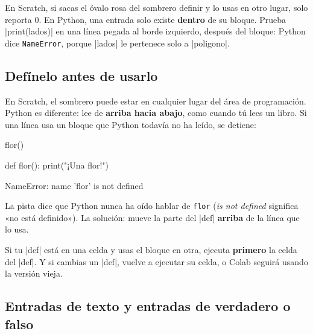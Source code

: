 \begin{think}
En Scratch, si sacas el óvalo rosa  del sombrero definir y lo usas en otro lugar, solo reporta 0. En Python, una entrada solo existe \textbf{dentro} de su bloque. Prueba \py|print(lados)| en una línea pegada al borde izquierdo, después del bloque: Python dice \texttt{NameError}, porque \py|lados| le pertenece solo a \py|poligono|.
\end{think}

\subsection*{Defínelo antes de usarlo}

En Scratch, el sombrero  puede estar en cualquier lugar del área de programación. Python es diferente: lee de \textbf{arriba hacia abajo}, como cuando tú lees un libro. Si una línea usa un bloque que Python todavía no ha leído, se detiene:

\begin{code}
flor()

def flor():
    print("¡Una flor!")
\end{code}
\begin{errorbox}
NameError: name 'flor' is not defined
\end{errorbox}

La pista dice que Python nunca ha oído hablar de \texttt{flor} (\textit{is not defined} significa «no está definido»). La solución: mueve la parte del \py|def| \textbf{arriba} de la línea que lo usa.

\begin{watchout}
Si tu \py|def| está en una celda y usas el bloque en otra, ejecuta \textbf{primero} la celda del \py|def|. Y si cambias un \py|def|, vuelve a ejecutar su celda, o Colab seguirá usando la versión vieja.
\end{watchout}

\subsection*{Entradas de texto y entradas de verdadero o falso}

